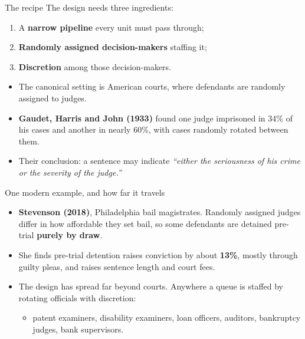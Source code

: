 \documentclass[
  11pt,
  ignorenonframetext,
  aspectratio=169,
]{beamer}
\providecommand{\tightlist}{%
  \setlength{\itemsep}{0pt}\setlength{\parskip}{0pt}}
\begin{document}
\begin{frame}{The recipe}
\protect{}\label{the-recipe}
The design needs three ingredients:

\begin{enumerate}
\tightlist
\item
  A \textbf{narrow pipeline} every unit must pass through;
\item
  \textbf{Randomly assigned decision-makers} staffing it;
\item
  \textbf{Discretion} among those decision-makers.
\end{enumerate}

\vspace{0.4em}

\begin{itemize}
\tightlist
\item
  The canonical setting is American courts, where defendants are
  randomly assigned to judges.
\item
  \textbf{Gaudet, Harris and John (1933)} found one judge imprisoned in
  34\% of his cases and another in nearly 60\%, with cases randomly
  rotated between them.
\item
  Their conclusion: a sentence may indicate \emph{``either the
  seriousness of his crime or the severity of the judge.''}
\end{itemize}
\end{frame}

\begin{frame}{One modern example, and how far it travels}
\protect{}\label{one-modern-example-and-how-far-it-travels}
\begin{itemize}
\tightlist
\item
  \textbf{Stevenson (2018)}, Philadelphia bail magistrates. Randomly
  assigned judges differ in how affordable they set bail, so some
  defendants are detained pre-trial \textbf{purely by draw}.
\item
  She finds pre-trial detention raises conviction by about
  \textbf{13\%}, mostly through guilty pleas, and raises sentence length
  and court fees.
\end{itemize}

\vspace{0.4em}

\begin{itemize}
\tightlist
\item
  The design has spread far beyond courts. Anywhere a queue is staffed
  by rotating officials with discretion:

  \begin{itemize}
  \tightlist
  \item
    patent examiners, disability examiners, loan officers, auditors,
    bankruptcy judges, bank supervisors.
  \end{itemize}
\end{itemize}
\end{frame}
\end{document}
